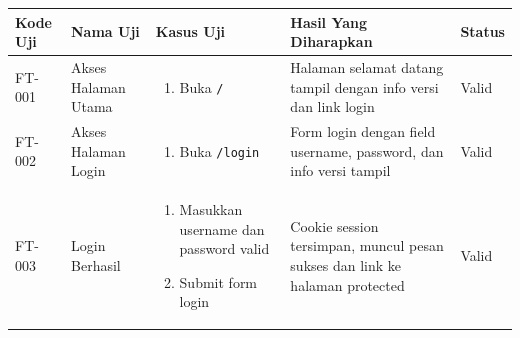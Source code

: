 \begin{table}[H]
  \centering
  \small
  \begin{adjustbox}{width=\textwidth}
    \begin{tabular}{|p{0.8cm}|p{2.6cm}|p{4.5cm}|p{3.8cm}|p{1.2cm}|}
      \hline
      \textbf{Kode Uji}                                                           & \textbf{Nama Uji}                  & \textbf{Kasus Uji} & \textbf{Hasil Yang Diharapkan} & \textbf{Status} \\
      \hline
      FT-001                                                                      & Akses Halaman Utama                &
      \begin{enumerate}[leftmargin=*,noitemsep,topsep=0pt,label=\arabic*.,widest=99]
        \item Buka \texttt{/}
      \end{enumerate}             &
      Halaman selamat datang tampil dengan info versi dan link login              & Valid                                                                                                      \\ \hline

      FT-002                                                                      & Akses Halaman Login                &
      \begin{enumerate}[leftmargin=*,noitemsep,topsep=0pt,label=\arabic*.,widest=99]
        \item Buka \texttt{/login}
      \end{enumerate}            &
      Form login dengan field username, password, dan info versi tampil           & Valid                                                                                                      \\ \hline

      FT-003                                                                      & Login Berhasil                     &
      \begin{enumerate}[leftmargin=*,noitemsep,topsep=0pt,label=\arabic*.,widest=99]
        \item Masukkan username dan password valid
        \item Submit form login
      \end{enumerate}            &
      Cookie session tersimpan, muncul pesan sukses dan link ke halaman protected & Valid                                                                                                      \\ \hline


\end{tabular}
\end{adjustbox}
\end{table}
